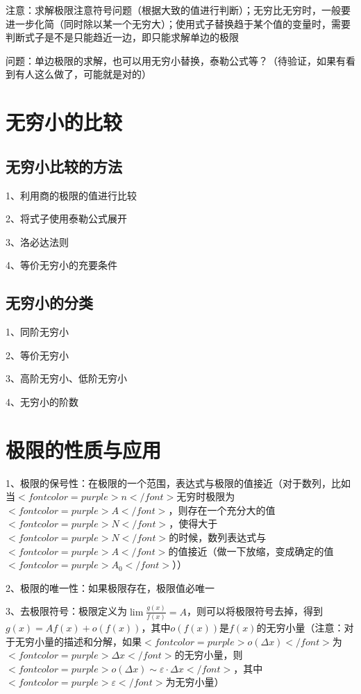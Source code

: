 注意：求解极限注意符号问题（根据大致的值进行判断）；无穷比无穷时，一般要进一步化简（同时除以某一个无穷大）；使用式子替换趋于某个值的变量时，需要判断式子是不是只能趋近一边，即只能求解单边的极限

问题：单边极限的求解，也可以用无穷小替换，泰勒公式等？（待验证，如果有看到有人这么做了，可能就是对的）

\section{无穷小的比较}



\subsection{无穷小比较的方法}

1、利用商的极限的值进行比较

2、将式子使用泰勒公式展开

3、洛必达法则

4、等价无穷小的充要条件



\subsection{无穷小的分类}

1、同阶无穷小

2、等价无穷小

3、高阶无穷小、低阶无穷小

4、无穷小的阶数

\section{极限的性质与应用}

1、极限的保号性：在极限的一个范围，表达式与极限的值接近（对于数列，比如当$ <font color=purple>n</font> $无穷时极限为$ <font color=purple>A</font> $，则存在一个充分大的值$ <font color=purple>N</font> $，使得大于$ <font color=purple>N</font> $的时候，数列表达式与$ <font color=purple>A</font> $的值接近（做一下放缩，变成确定的值$ <font color=purple>A_0</font> $））

2、极限的唯一性：如果极限存在，极限值必唯一

3、去极限符号：极限定义为$ \lim \frac{g(x)}{f(x)}=A $，则可以将极限符号去掉，得到$ g(x) = Af(x)+o(f(x)) $，其中$ o(f(x)) $是$ f(x) $的无穷小量（注意：对于无穷小量的描述和分解，如果$ <font color=purple>o(\Delta x)</font> $为$ <font color=purple>\Delta x</font> $的无穷小量，则$ <font color=purple>o(\Delta x) \sim \varepsilon·\Delta x</font> $，其中$ <font color=purple>\varepsilon</font> $为无穷小量）

